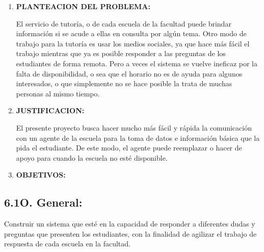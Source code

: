 \documentclass[12pt]{report}
\begin{document}
\vspace{\baselineskip}
\begin{enumerate}
	\item \textbf{PLANTEACION DEL PROBLEMA:}\par

{\fontsize{10pt}{12.0pt}\selectfont El servicio de tutoría, o de cada escuela de la facultad puede brindar información si se acude a ellas en consulta por algún tema. Otro modo de trabajo para la tutoría es usar los medios sociales, ya que hace más fácil el trabajo mientras que ya es posible responder a las preguntas de los estudiantes de forma remota. Pero a veces el sistema se vuelve ineficaz por la falta de disponibilidad, o sea que el horario no es de ayuda para algunos interesados, o que simplemente no se hace posible la trata de muchas personas al mismo tiempo.\par}\par


\vspace{\baselineskip}
	\item \textbf{JUSTIFICACION:}\par

{\fontsize{10pt}{12.0pt}\selectfont El presente proyecto busca hacer mucho más fácil y rápida la comunicación con un agente de la escuela para la toma de datos e información básica que la pida el estudiante. De este modo, el agente puede reemplazar o hacer de apoyo para cuando la escuela no esté disponible.\par}\par


\vspace{\baselineskip}
	\item \textbf{OBJETIVOS:}\par


\end{enumerate}\subsection*{6.1\hspace*{10pt}O. General:}
{\fontsize{10pt}{12.0pt}\selectfont Construir un sistema que esté en la capacidad de responder a diferentes dudas y preguntas que presenten los estudiantes, con la finalidad de agilizar el trabajo de respuesta de cada escuela en la facultad.\par}\par
\end{document}
